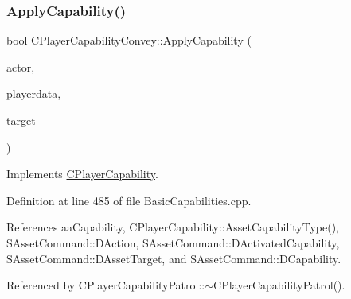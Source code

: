 \subsubsection{\texorpdfstring{Apply\+Capability()}{ApplyCapability()}}
{\footnotesize\ttfamily bool C\+Player\+Capability\+Convey\+::\+Apply\+Capability (\begin{DoxyParamCaption}\item[{std\+::shared\+\_\+ptr$<$ \hyperlink{classCPlayerAsset}{C\+Player\+Asset} $>$}]{actor,  }\item[{std\+::shared\+\_\+ptr$<$ \hyperlink{classCPlayerData}{C\+Player\+Data} $>$}]{playerdata,  }\item[{std\+::shared\+\_\+ptr$<$ \hyperlink{classCPlayerAsset}{C\+Player\+Asset} $>$}]{target }\end{DoxyParamCaption})\hspace{0.3cm}{\ttfamily [virtual]}}



Implements \hyperlink{classCPlayerCapability_a2ca6fd7fbd9c0178f1cf1d049c63825f}{C\+Player\+Capability}.



Definition at line 485 of file Basic\+Capabilities.\+cpp.



References aa\+Capability, C\+Player\+Capability\+::\+Asset\+Capability\+Type(), S\+Asset\+Command\+::\+D\+Action, S\+Asset\+Command\+::\+D\+Activated\+Capability, S\+Asset\+Command\+::\+D\+Asset\+Target, and S\+Asset\+Command\+::\+D\+Capability.



Referenced by C\+Player\+Capability\+Patrol\+::$\sim$\+C\+Player\+Capability\+Patrol().


